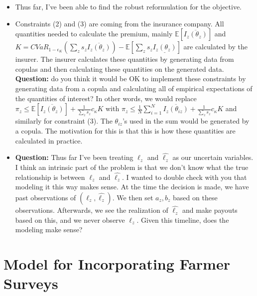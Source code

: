 \documentclass[11pt]{article}
\begin{document}
  \begin{itemize}
    \item Thus far, I've been able to find the robust reformulation for the objective. 
    \item Constraints (2) and (3) are coming from the insurance company. All quantities needed to calculate the premium, mainly $\mathbb{E}\left [ \overline{I_z(\theta_z)} \right ]$ and $K= CVaR_{1-\epsilon_K} \left ( \sum_z s_z\overline{I_z(\theta_z)} \right ) - \mathbb{E}\left [ \sum_z s_z\underline{I_z(\theta_z)} \right ]$ are calculated by the insurer. The insurer calculates these quantities by generating data from copulas and then calculating these quantities on the generated data. \textbf{Question:} do you think it would be OK to implement these constraints by generating data from a copula and calculating all of empirical expectations of the quantities of interest? In other words, we would replace $\pi_z  \leq \mathbb{E}\left [ \overline{I_z(\theta_z)} \right ] + \frac{1}{\sum_z s_z} c_{\kappa} K$ with $\pi_z  \leq \frac{1}{N}\sum_{i=1}^N \overline{I_z(\theta_{iz})}  + \frac{1}{\sum_z s_z} c_{\kappa} K$ and similarly for constraint (3). The $\theta_{iz}$'s used in the sum would be generated by a copula. The motivation for this is that this is how these quantities are calculated in practice. 
    \item \textbf{Question:} Thus far I've been treating $\ell_z$ and $\hat{\ell_z}$ as our uncertain variables. I think an intrinsic part of the problem is that we don't know what the true relationship is between $\ell_z$ and $\hat{\ell_z}$. I wanted to double check with you that modeling it this way makes sense. At the time the decision is made, we have past observations of $(\ell_z,\hat{\ell_z})$. We then set $a_z, b_z$ based on these observations. Afterwards, we see the realization of $\hat{\ell_z}$ and make payouts based on this, and we never observe $\ell_z$. Given this timeline, does the modeling make sense?
  \end{itemize}

\section{Model for Incorporating Farmer Surveys} \label{limited-data}
\end{document}
